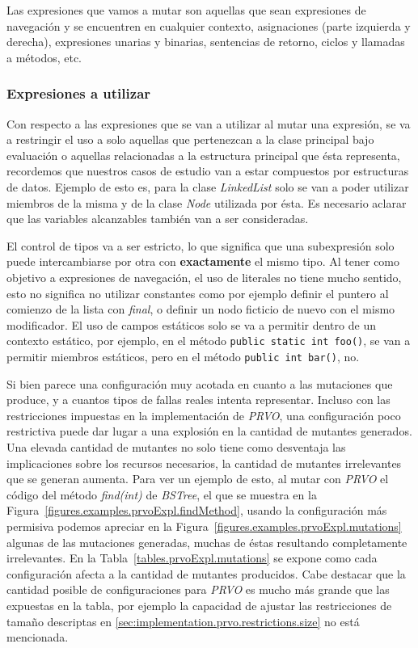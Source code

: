 Las expresiones que vamos a mutar son aquellas que sean expresiones de navegaci\'on y se encuentren en cualquier contexto, asignaciones (parte izquierda y derecha), expresiones unarias y binarias, sentencias de retorno, ciclos y llamadas a m\'etodos, etc.

\subsubsection{Expresiones a utilizar}

Con respecto a las expresiones que se van a utilizar al mutar una expresi\'on, se va a restringir el uso a solo aquellas que pertenezcan a la clase principal bajo evaluaci\'on o aquellas relacionadas a la estructura principal que \'esta representa, recordemos que nuestros casos de estudio van a estar compuestos por estructuras de datos. Ejemplo de esto es, para la clase \emph{LinkedList} solo se van a poder utilizar miembros de la misma y de la clase \emph{Node} utilizada por \'esta. Es necesario aclarar que las variables alcanzables tambi\'en van a ser consideradas.

El control de tipos va a ser estricto, lo que significa que una subexpresi\'on solo puede intercambiarse por otra con \textbf{exactamente} el mismo tipo. Al tener como objetivo a expresiones de navegaci\'on, el uso de literales no tiene mucho sentido, esto no significa no utilizar constantes como por ejemplo definir el puntero al comienzo de la lista con \emph{final}, o definir un nodo ficticio de nuevo con el mismo modificador. El uso de campos est\'aticos solo se va a permitir dentro de un contexto est\'atico, por ejemplo, en el m\'etodo \lstinline|public static int foo()|, se van a permitir miembros est\'aticos, pero en el m\'etodo \lstinline|public int bar()|, no.

Si bien parece una configuraci\'on muy acotada en cuanto a las mutaciones que produce, y a cuantos tipos de fallas reales intenta representar. Incluso con las restricciones impuestas en la implementaci\'on de \emph{PRVO}, una configuraci\'on poco restrictiva puede dar lugar a una explosi\'on en la cantidad de mutantes generados. Una elevada cantidad de mutantes no solo tiene como desventaja las implicaciones sobre los recursos necesarios, la cantidad de mutantes irrelevantes que se generan aumenta. Para ver un ejemplo de esto, al mutar con \emph{PRVO} el c\'odigo del m\'etodo \emph{find(int)} de \emph{BSTree}, el que se muestra en la Figura~\ref{figures.examples.prvoExpl.findMethod}, usando la configuraci\'on m\'as permisiva podemos apreciar en la Figura~\ref{figures.examples.prvoExpl.mutations} algunas de las mutaciones generadas, muchas de \'estas resultando completamente irrelevantes. En la Tabla~\ref{tables.prvoExpl.mutations} se expone como cada configuraci\'on afecta a la cantidad de mutantes producidos. Cabe destacar que la cantidad posible de configuraciones para \emph{PRVO} es mucho m\'as grande que las expuestas en la tabla, por ejemplo la capacidad de ajustar las restricciones de tama\~no descriptas en \ref{sec:implementation.prvo.restrictions.size} no est\'a mencionada.

